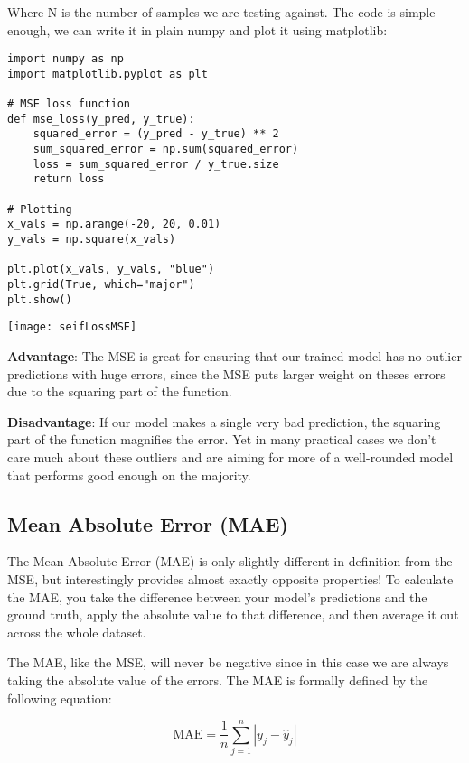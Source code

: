 Where N is the number of samples we are testing against. The code is simple enough, we can write it in plain numpy and plot it using matplotlib:

\begin{lstlisting}
import numpy as np
import matplotlib.pyplot as plt

# MSE loss function
def mse_loss(y_pred, y_true):
    squared_error = (y_pred - y_true) ** 2
    sum_squared_error = np.sum(squared_error)
    loss = sum_squared_error / y_true.size
    return loss
    
# Plotting
x_vals = np.arange(-20, 20, 0.01)
y_vals = np.square(x_vals)

plt.plot(x_vals, y_vals, "blue")
plt.grid(True, which="major")
plt.show()
\end{lstlisting}

\begin{marginfigure}
\texttt{[image: seifLossMSE]}
\end{marginfigure}

\textbf{Advantage}: The MSE is great for ensuring that our trained model has no outlier predictions with huge errors, since the MSE puts larger weight on theses errors due to the squaring part of the function.

\textbf{Disadvantage}: If our model makes a single very bad prediction, the squaring part of the function magnifies the error. Yet in many practical cases we don't care much about these outliers and are aiming for more of a well-rounded model that performs good enough on the majority.

\subsection{Mean Absolute Error (MAE)}

The Mean Absolute Error (MAE) is only slightly different in definition from the MSE, but interestingly provides almost exactly opposite properties! To calculate the MAE, you take the difference between your model's predictions and the ground truth, apply the absolute value to that difference, and then average it out across the whole dataset.

The MAE, like the MSE, will never be negative since in this case we are always taking the absolute value of the errors. The MAE is formally defined by the following equation: 

\begin{equation}
\mathrm{MAE}=\frac{1}{n} \sum_{j=1}^{n}\left|y_{j}-\hat{y}_{j}\right|
\end{equation}

